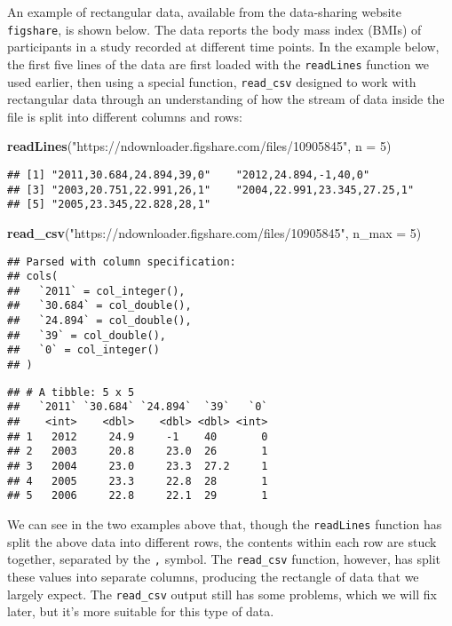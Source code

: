 \documentclass[]{book}
\newenvironment{Shaded}{\begin{snugshade}}{\end{snugshade}}
\newcommand{\KeywordTok}[1]{\textcolor[rgb]{0.13,0.29,0.53}{\textbf{#1}}}
\newcommand{\DataTypeTok}[1]{\textcolor[rgb]{0.13,0.29,0.53}{#1}}
\newcommand{\DecValTok}[1]{\textcolor[rgb]{0.00,0.00,0.81}{#1}}
\newcommand{\StringTok}[1]{\textcolor[rgb]{0.31,0.60,0.02}{#1}}
\newcommand{\NormalTok}[1]{#1}
\theoremstyle{definition}
\theoremstyle{definition}
\theoremstyle{definition}
\theoremstyle{remark}
\begin{document}
An example of rectangular data, available from the data-sharing website
\texttt{figshare}, is shown below. The data reports the body mass index
(BMIs) of participants in a study recorded at different time points. In
the example below, the first five lines of the data are first loaded
with the \texttt{readLines} function we used earlier, then using a
special function, \texttt{read\_csv} designed to work with rectangular
data through an understanding of how the stream of data inside the file
is split into different columns and rows:

\begin{Shaded}
\begin{Highlighting}[]
\KeywordTok{readLines}\NormalTok{(}\StringTok{"https://ndownloader.figshare.com/files/10905845"}\NormalTok{, }\DataTypeTok{n =} \DecValTok{5}\NormalTok{)}
\end{Highlighting}
\end{Shaded}

\begin{verbatim}
## [1] "2011,30.684,24.894,39,0"    "2012,24.894,-1,40,0"       
## [3] "2003,20.751,22.991,26,1"    "2004,22.991,23.345,27.25,1"
## [5] "2005,23.345,22.828,28,1"
\end{verbatim}

\begin{Shaded}
\begin{Highlighting}[]
\KeywordTok{read_csv}\NormalTok{(}\StringTok{"https://ndownloader.figshare.com/files/10905845"}\NormalTok{, }\DataTypeTok{n_max =} \DecValTok{5}\NormalTok{)}
\end{Highlighting}
\end{Shaded}

\begin{verbatim}
## Parsed with column specification:
## cols(
##   `2011` = col_integer(),
##   `30.684` = col_double(),
##   `24.894` = col_double(),
##   `39` = col_double(),
##   `0` = col_integer()
## )
\end{verbatim}

\begin{verbatim}
## # A tibble: 5 x 5
##   `2011` `30.684` `24.894`  `39`   `0`
##    <int>    <dbl>    <dbl> <dbl> <int>
## 1   2012     24.9     -1    40       0
## 2   2003     20.8     23.0  26       1
## 3   2004     23.0     23.3  27.2     1
## 4   2005     23.3     22.8  28       1
## 5   2006     22.8     22.1  29       1
\end{verbatim}

We can see in the two examples above that, though the \texttt{readLines}
function has split the above data into different rows, the contents
within each row are stuck together, separated by the \texttt{,} symbol.
The \texttt{read\_csv} function, however, has split these values into
separate columns, producing the rectangle of data that we largely
expect. The \texttt{read\_csv} output still has some problems, which we
will fix later, but it's more suitable for this type of data.
\end{document}
